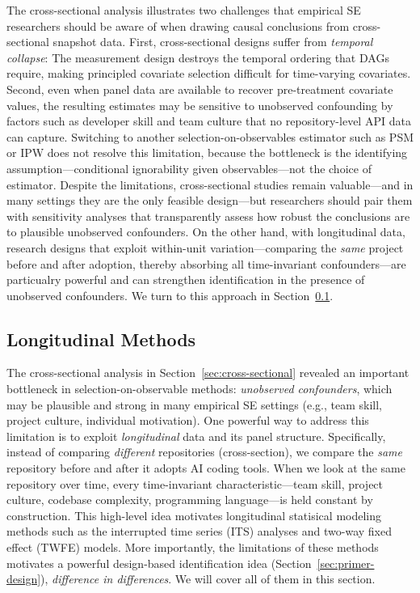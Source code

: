 The cross-sectional analysis illustrates two challenges that empirical SE researchers should be aware of when drawing causal conclusions from cross-sectional snapshot data.
First, cross-sectional designs suffer from \emph{temporal collapse}: The measurement design destroys the temporal ordering that DAGs require, making principled covariate selection difficult for time-varying covariates.
Second, even when panel data are available to recover pre-treatment covariate values, the resulting estimates may be sensitive to unobserved confounding by factors such as developer skill and team culture that no repository-level API data can capture.
Switching to another selection-on-observables estimator such as PSM or IPW does not resolve this limitation, because the bottleneck is the identifying assumption---conditional ignorability given observables---not the choice of estimator.
Despite the limitations, cross-sectional studies remain valuable---and in many settings they are the only feasible design---but researchers should pair them with sensitivity analyses that transparently assess how robust the conclusions are to plausible unobserved confounders.
On the other hand, with longitudinal data, research designs that exploit within-unit variation---comparing the \emph{same} project before and after adoption, thereby absorbing all time-invariant confounders---are particualry powerful and can strengthen identification in the presence of unobserved confounders.
We turn to this approach in Section~\ref{sec:longitudinal}.

\subsection{Longitudinal Methods}
\label{sec:longitudinal}

The cross-sectional analysis in Section~\ref{sec:cross-sectional} revealed an important bottleneck in selection-on-observable methods: \emph{unobserved confounders}, which may be plausible and strong in many empirical SE settings (e.g., team skill, project culture, individual motivation).
One powerful way to address this limitation is to exploit \emph{longitudinal} data and its panel structure.
Specifically, instead of comparing \emph{different} repositories (cross-section), we compare the \emph{same} repository before and after it adopts AI coding tools.
When we look at the same repository over time, every time-invariant characteristic---team skill, project culture, codebase complexity, programming language---is held constant by construction.
This high-level idea motivates longitudinal statisical modeling methods such as the interrupted time series (ITS) analyses and two-way fixed effect (TWFE) models.
More importantly, the limitations of these methods motivates a powerful design-based identification idea (Section~\ref{sec:primer-design}), \emph{difference in differences}.
We will cover all of them in this section.

